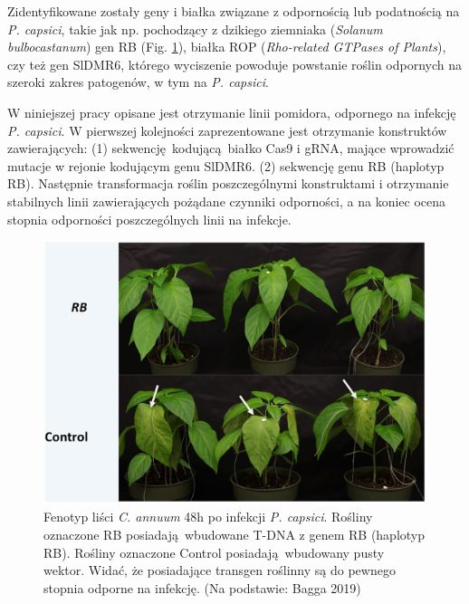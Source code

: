 \documentclass[two column, twoside, a4paper]{article}
\begin{document}
Zidentyfikowane zostały geny i białka związane z odpornością lub podatnością na \textit{P. capsici}, takie jak np. pochodzący z dzikiego ziemniaka (\textit{Solanum bulbocastanum}) gen RB (Fig. \ref{fig::c_annuum})\autocite{Song2003, Bagga2019}, białka ROP (\textit{Rho-related GTPases of Plants})\autocite{Yang2020}, czy też gen SlDMR6, którego wyciszenie powoduje powstanie roślin odpornych na szeroki zakres patogenów, w tym na \textit{P. capsici}\autocite{deToledoThomazella2016}.

W niniejszej pracy opisane jest otrzymanie linii pomidora, odpornego na infekcję \textit{P. capsici}. W pierwszej kolejności zaprezentowane jest otrzymanie konstruktów zawierających: (1) sekwencję kodującą białko Cas9 i gRNA, mające wprowadzić mutacje w rejonie kodującym genu SlDMR6. (2) sekwencję genu RB (haplotyp RB). Następnie transformacja roślin poszczególnymi konstruktami i otrzymanie stabilnych linii zawierających pożądane czynniki odporności, a na koniec ocena stopnia odporności poszczególnych linii na infekcje.

\begin{figure}[tp]
\begin{tcolorbox}
	\centering
	\includegraphics[width=\textwidth]{./figures/c_annuum.png}
	\caption{Fenotyp liści \textit{C. annuum} 48h po infekcji \textit{P. capsici}. Rośliny oznaczone RB posiadają wbudowane T-DNA z genem RB (haplotyp RB). Rośliny oznaczone Control posiadają wbudowany pusty wektor. Widać, że posiadające transgen roślinny są do pewnego stopnia odporne na infekcję. (Na podstawie: Bagga 2019)}\label{fig::c_annuum}
\end{tcolorbox}
\end{figure}
\end{document}
